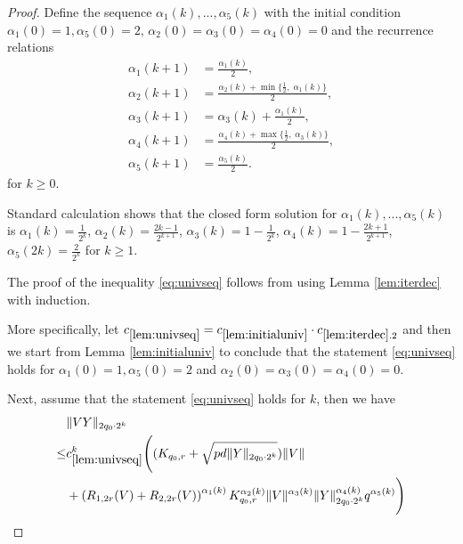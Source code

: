 \documentclass[11pt]{amsart}
\numberwithin{equation}{section}
\numberwithin{equation}{section}
\DeclarePairedDelimiter{\norm}{\lVert}{\rVert}
\begin{document}
\begin{proof}

Define the sequence $\alpha_1(k),...,\alpha_5(k)$ with the initial condition $\alpha_1(0)=1,\alpha_5(0)=2$, $\alpha_2(0)=\alpha_3(0)=\alpha_4(0)=0$ and the recurrence relations
\begin{align*}
\alpha_1(k+1)&=\frac{\alpha_1(k)}{2}, \\[0.5em]
\alpha_2(k+1)&=\frac{\alpha_2(k)+\min\{\tfrac12,\;\alpha_1(k)\}}{2}, \\[0.5em]
\alpha_3(k+1)&=\alpha_3(k)+\frac{\alpha_1(k)}{2}, \\[0.5em]
\alpha_4(k+1)&=\frac{\alpha_4(k)+\max\{\tfrac12,\;\alpha_3(k)\}}{2}, \\[0.5em]
\alpha_5(k+1)&=\frac{\alpha_5(k)}{2}.
\end{align*}
for $k \ge 0$.

Standard calculation shows that the closed form solution for $\alpha_1(k),...,\alpha_5(k)$ is $\alpha_1(k)=\frac{1}{2^k}$, $\alpha_2(k)=\frac{2k-1}{2^{k+1}}$, $\alpha_3(k)=1-\frac{1}{2^k}$, $\alpha_4(k)=1-\frac{2k+1}{2^{k+1}}$, $\alpha_5(2k)=\frac{2}{2^k}$ for $k \ge 1$.

    The proof of the inequality \ref{eq:univseq} follows from using Lemma \ref{lem:iterdec} with induction.
    
    More specifically, let $c_{\ref{lem:univseq}}=c_{\ref{lem:initialuniv}} \cdot c_{\ref{lem:iterdec}.2}$ and then we start from Lemma \ref{lem:initialuniv} to conclude that the statement \ref{eq:univseq} holds for $\alpha_1(0)=1,\alpha_5(0)=2$ and $\alpha_2(0)=\alpha_3(0)=\alpha_4(0)=0$.

    

    Next, assume that the statement \ref{eq:univseq} holds for $k$, then we have
    \begin{align*}
        &\norm{VY}_{2q_0\cdot 2^k} \\\le& c_{\ref{lem:univseq}}^k \Bigg((K_{q_0,r}+\sqrt{pd\norm{Y}_{2q_0\cdot 2^k}})\norm{V} \\&+ \left(R_{1,2r}(V)+R_{2,2r}(V)\right)^{\alpha_1(k)}K_{q_0,r}^{\alpha_2(k)}\norm{V}^{\alpha_3(k)} \norm{Y}_{2q_0 \cdot 2^k}^{\alpha_4(k)}q^{\alpha_5(k)}\Bigg)
    \end{align*}


\end{proof}
\end{document}
